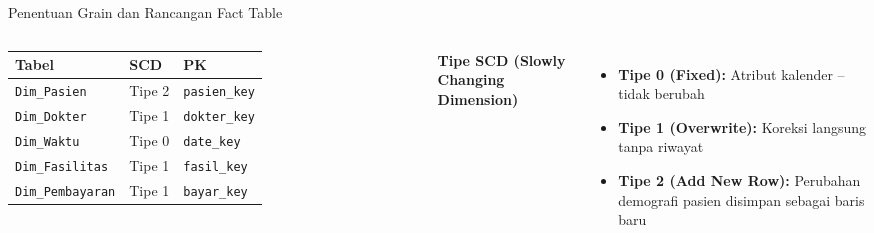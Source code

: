 \documentclass[xcolor=table,t,aspectratio=169]{beamer}
\begin{document}
\begin{frame}{Penentuan Grain dan Rancangan Fact Table}
\begin{columns}[T]
    \scriptsize
    \begin{tabular}{@{}lll@{}}
      \toprule
      \textbf{Tabel} & \textbf{SCD} & \textbf{PK} \\
      \midrule
      \texttt{Dim\_Pasien}     & Tipe 2 & \texttt{pasien\_key} \\
      \texttt{Dim\_Dokter}     & Tipe 1 & \texttt{dokter\_key} \\
      \texttt{Dim\_Waktu}      & Tipe 0 & \texttt{date\_key}   \\
      \texttt{Dim\_Fasilitas}  & Tipe 1 & \texttt{fasil\_key}  \\
      \texttt{Dim\_Pembayaran} & Tipe 1 & \texttt{bayar\_key}  \\
      \bottomrule
    \end{tabular}

    \vspace{8pt}
    \textbf{Tipe SCD (Slowly Changing Dimension)}
    \begin{itemize}
      \scriptsize
      \item \textbf{Tipe 0 (Fixed):} Atribut kalender -- tidak berubah
      \item \textbf{Tipe 1 (Overwrite):} Koreksi langsung tanpa riwayat
      \item \textbf{Tipe 2 (Add New Row):} Perubahan demografi pasien disimpan sebagai baris baru
    \end{itemize}
  \end{columns}
\end{frame}
\end{document}
